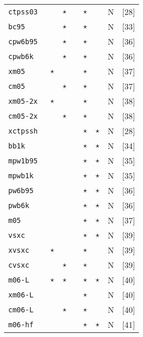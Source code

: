 \begin{table}[htp]
{\begin{tabular}{|l|p{0.12cm}p{0.12cm}cccp{0.35cm}|c|}
{\tt  ctpss03  }&          &  $\star$    &           &$\star$&   &  N   &[28]\\
{\tt  bc95     }&          &  $\star$    &           &$\star$&   &  N   &[33]\\
{\tt  cpw6b95  }&          &  $\star$    &           &$\star$&   &  N   &[36]\\
{\tt  cpwb6k   }&          &  $\star$    &           &$\star$&   &  N   &[36]\\
{\tt  xm05     }& $\star$  &             &           &$\star$&   &  N   &[37]\\
{\tt  cm05     }&          &  $\star$    &           &$\star$&   &  N   &[37]\\
{\tt  xm05-2x  }& $\star$  &             &           &$\star$&   &  N   &[38]\\
{\tt  cm05-2x  }&          &  $\star$    &           &$\star$&   &  N   &[38]\\
{\tt  xctpssh  }&          &             &       &$\star$&$\star$&  N   &[28]\\
{\tt  bb1k     }&          &             &       &$\star$&$\star$&  N   &[34]\\
{\tt  mpw1b95  }&          &             &       &$\star$&$\star$&  N   &[35]\\
{\tt  mpwb1k   }&          &             &       &$\star$&$\star$&  N   &[35]\\
{\tt  pw6b95   }&          &             &       &$\star$&$\star$&  N   &[36]\\
{\tt  pwb6k    }&          &             &       &$\star$&$\star$&  N   &[36]\\
{\tt  m05      }&          &             &       &$\star$&$\star$&  N   &[37]\\
{\tt  vsxc     }&          &             &       &$\star$&$\star$&  N   &[39]\\
{\tt  xvsxc    }& $\star$  &             &       &$\star$&       &  N   &[39]\\
{\tt  cvsxc    }&          & $\star$     &       &$\star$&       &  N   &[39]\\
{\tt  m06-L    }& $\star$  & $\star$     &       &$\star$&$\star$&  N   &[40]\\
{\tt  xm06-L   }&          &             &       &$\star$&       &  N   &[40]\\
{\tt  cm06-L   }&          & $\star$     &       &$\star$&       &  N   &[40]\\
{\tt  m06-hf   }&          &             &       &$\star$&$\star$&  N   &[41]\\

\end{tabular}}
\end{table}
